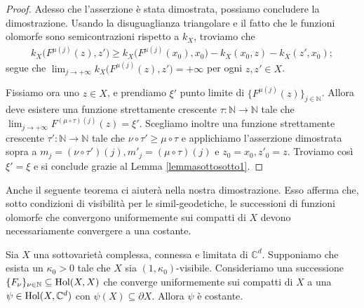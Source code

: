 \begin{proof}
    Adesso che l'asserzione è stata dimostrata, possiamo concludere la dimostrazione. Usando la disuguaglianza triangolare e il fatto che le funzioni olomorfe sono semicontrazioni rispetto a $k_X$, troviamo che
    \begin{gather*}
        k_X\big(F^{\mu(j)}(z),z'\big) \ge k_X\big(F^{\mu(j)}(x_0),x_0\big)-k_X(x_0,z)-k_X(z',x_0);
    \end{gather*}
    segue che $\displaystyle\lim_{j\longrightarrow+\infty}k_X\big(F^{\mu(j)}(z),z'\big)=+\infty$ per ogni $z,z' \in X$.

     Fissiamo ora uno $z\in X$, e prendiamo $\xi'$ punto limite di $\{F^{\mu(j)}(z)\}_{j\in\mathbb{N}}$. Allora deve esistere una funzione strettamente crescente $\tau:\mathbb{N}\longrightarrow\mathbb{N}$ tale che $\displaystyle \lim_{j\longrightarrow+\infty} F^{(\mu\circ\tau)(j)}(z)=\xi'$. Scegliamo inoltre una funzione strettamente crescente $\tau':\mathbb{N}\longrightarrow\mathbb{N}$ tale che $\nu\circ\tau' \ge \mu\circ\tau$ e applichiamo l'asserzione dimostrata sopra a $m_j=(\nu\circ\tau')(j), m'_j=(\mu\circ\tau)(j)$ e $z_0=x_0,z'_0=z$. Troviamo così $\xi'=\xi$ e si conclude grazie al Lemma \ref{lemmasottosotto1}.
\end{proof}

Anche il seguente teorema ci aiuterà nella nostra dimostrazione. Esso afferma che, sotto condizioni di visibilità per le simil-geodetiche, le successioni di funzioni olomorfe che convergono uniformemente sui compatti di $X$ devono necessariamente convergere a una costante.

\begin{thm} \label{lim_is_const}
    Sia $X$ una sottovarietà complessa, connessa e limitata di $\mathbb{C}^d$. Supponiamo che esista un $\kappa_0>0$ tale che $X$ sia $(1,\kappa_0)$-visibile. Consideriamo una successione $\{F_\nu\}_{\nu\in\mathbb{N}} \subseteq \textnormal{Hol}(X,X)$ che converge uniformemente sui compatti di $X$ a una $\psi\in\textnormal{Hol}(X,\mathbb{C}^d)$ con $\psi(X)\subseteq\partial X$. Allora $\psi$ è costante.
\end{thm}

